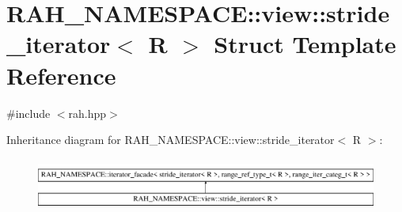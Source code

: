 \hypertarget{struct_r_a_h___n_a_m_e_s_p_a_c_e_1_1view_1_1stride__iterator}{}\section{R\+A\+H\+\_\+\+N\+A\+M\+E\+S\+P\+A\+CE\+::view\+::stride\+\_\+iterator$<$ R $>$ Struct Template Reference}
\label{struct_r_a_h___n_a_m_e_s_p_a_c_e_1_1view_1_1stride__iterator}


{\ttfamily \#include $<$rah.\+hpp$>$}

Inheritance diagram for R\+A\+H\+\_\+\+N\+A\+M\+E\+S\+P\+A\+CE\+::view\+::stride\+\_\+iterator$<$ R $>$\+:\begin{figure}[H]
\begin{center}
\leavevmode
\includegraphics[height=1.741835cm]{struct_r_a_h___n_a_m_e_s_p_a_c_e_1_1view_1_1stride__iterator}
\end{center}
\end{figure}
